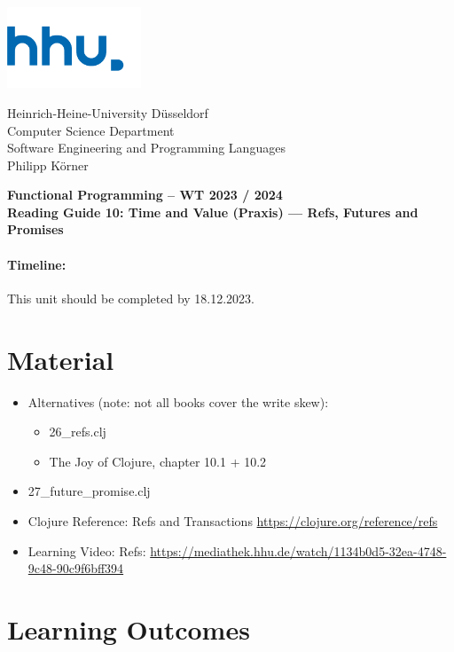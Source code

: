 \documentclass[11pt,a4paper]{article}
\begin{document}
\begin{minipage}[b]{\textwidth}
	\parbox[t]{5cm}{%
		\includegraphics[width=4cm]{unilogo}
		\hfill
	}
	\parbox[b]{11cm}{%
		Heinrich-Heine-University D\"usseldorf\\
		Computer Science Department\\
		Software Engineering and Programming Languages\\
		Philipp K\"orner
	}
\end{minipage}
\begin{center}
	\bf
	Functional Programming -- WT 2023 / 2024\\
	Reading Guide 10: Time and Value (Praxis) --- Refs, Futures and Promises
\end{center}

\pagestyle{empty}

\paragraph{Timeline:} This unit should be completed by 18.12.2023.

\section{Material} 

\begin{itemize}
    \item Alternatives (note: not all books cover the write skew):
        \begin{itemize}
            \item 26\_refs.clj
            \item The Joy of Clojure, chapter 10.1 + 10.2
        \end{itemize}
            \item 27\_future\_promise.clj
    \item Clojure Reference: Refs and Transactions \url{https://clojure.org/reference/refs}
    \item Learning Video: Refs: \url{https://mediathek.hhu.de/watch/1134b0d5-32ea-4748-9c48-90c9f6bff394}
\end{itemize}


\section{Learning Outcomes}
\end{document}
